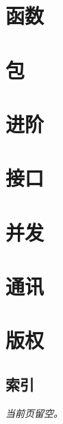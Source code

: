\documentclass[a4paper,twoside,openleft]{blocksbook}
\begin{document}
\chapter{函数}
\label{chap:functions}


\chapter{包}
\label{chap:packages}


\chapter{进阶}
\label{chap:beyond}


\chapter{接口}
\label{chap:interfaces}


\chapter{并发}
\label{chap:channels}


\chapter{通讯}
\label{chap:communication}



\appendix

\chapter{版权}


\begin{twocolumn}
\chapter{索引}
\printindex
\end{twocolumn}
\begin{onecolumn}



\newpage
\thispagestyle{empty}
\begin{center}
\emph{当前页留空。}
\end{center}
\end{onecolumn}
\end{document}
